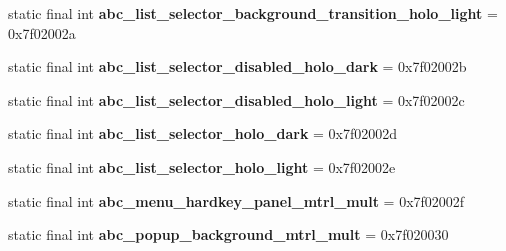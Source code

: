 \begin{DoxyCompactItemize}
\item 
\hypertarget{classandroid_1_1support_1_1design_1_1_r_1_1drawable_acdc506ea7e02796a9ad1948d4e592b75}{}static final int {\bfseries abc\+\_\+list\+\_\+selector\+\_\+background\+\_\+transition\+\_\+holo\+\_\+light} = 0x7f02002a\label{classandroid_1_1support_1_1design_1_1_r_1_1drawable_acdc506ea7e02796a9ad1948d4e592b75}

\item 
\hypertarget{classandroid_1_1support_1_1design_1_1_r_1_1drawable_a94c12f905a060bba7d244eed598e1461}{}static final int {\bfseries abc\+\_\+list\+\_\+selector\+\_\+disabled\+\_\+holo\+\_\+dark} = 0x7f02002b\label{classandroid_1_1support_1_1design_1_1_r_1_1drawable_a94c12f905a060bba7d244eed598e1461}

\item 
\hypertarget{classandroid_1_1support_1_1design_1_1_r_1_1drawable_aeb140628ca835dff330e6f2e32de04a7}{}static final int {\bfseries abc\+\_\+list\+\_\+selector\+\_\+disabled\+\_\+holo\+\_\+light} = 0x7f02002c\label{classandroid_1_1support_1_1design_1_1_r_1_1drawable_aeb140628ca835dff330e6f2e32de04a7}

\item 
\hypertarget{classandroid_1_1support_1_1design_1_1_r_1_1drawable_a8aa940b01e43683a84407c10ca9ff622}{}static final int {\bfseries abc\+\_\+list\+\_\+selector\+\_\+holo\+\_\+dark} = 0x7f02002d\label{classandroid_1_1support_1_1design_1_1_r_1_1drawable_a8aa940b01e43683a84407c10ca9ff622}

\item 
\hypertarget{classandroid_1_1support_1_1design_1_1_r_1_1drawable_a928d3309d523c1fffb1ce9477b7c9b72}{}static final int {\bfseries abc\+\_\+list\+\_\+selector\+\_\+holo\+\_\+light} = 0x7f02002e\label{classandroid_1_1support_1_1design_1_1_r_1_1drawable_a928d3309d523c1fffb1ce9477b7c9b72}

\item 
\hypertarget{classandroid_1_1support_1_1design_1_1_r_1_1drawable_a338da0e1d3f5fe94baec6d62b4af2673}{}static final int {\bfseries abc\+\_\+menu\+\_\+hardkey\+\_\+panel\+\_\+mtrl\+\_\+mult} = 0x7f02002f\label{classandroid_1_1support_1_1design_1_1_r_1_1drawable_a338da0e1d3f5fe94baec6d62b4af2673}

\item 
\hypertarget{classandroid_1_1support_1_1design_1_1_r_1_1drawable_a44c8316321e929db60908ab6003732f7}{}static final int {\bfseries abc\+\_\+popup\+\_\+background\+\_\+mtrl\+\_\+mult} = 0x7f020030\label{classandroid_1_1support_1_1design_1_1_r_1_1drawable_a44c8316321e929db60908ab6003732f7}


\end{DoxyCompactItemize}
